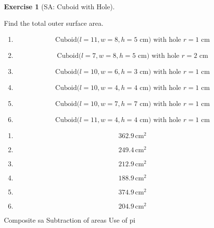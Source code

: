 \documentclass[
  letterpaper,
  DIV=11,
  numbers=noendperiod]{scrreprt}
\theoremstyle{definition}
\newtheorem{exercise}{Exercise}[chapter]
\theoremstyle{remark}
\begin{document}
\begin{exercise}[SA: Cuboid with
Hole]\protect\hypertarget{exr-sa-11}{}\label{exr-sa-11}

Find the total outer surface area.

\begin{enumerate}
\def\labelenumi{\alph{enumi})}
\item
  \[\text{Cuboid}(l=11,w=8,h=5\text{ cm) with hole }r=1\text{ cm}\]
\item
  \[\text{Cuboid}(l=7,w=8,h=5\text{ cm) with hole }r=2\text{ cm}\]
\item
  \[\text{Cuboid}(l=10,w=6,h=3\text{ cm) with hole }r=1\text{ cm}\]
\item
  \[\text{Cuboid}(l=10,w=4,h=4\text{ cm) with hole }r=1\text{ cm}\]
\item
  \[\text{Cuboid}(l=10,w=7,h=7\text{ cm) with hole }r=1\text{ cm}\]
\item
  \[\text{Cuboid}(l=11,w=4,h=4\text{ cm) with hole }r=1\text{ cm}\]
\end{enumerate}

\begin{tcolorbox}[enhanced jigsaw, opacitybacktitle=0.6, coltitle=black, arc=.35mm, colframe=quarto-callout-tip-color-frame, colback=white, bottomrule=.15mm, left=2mm, colbacktitle=quarto-callout-tip-color!10!white, titlerule=0mm, opacityback=0, title=\textcolor{quarto-callout-tip-color}{\faLightbulb}\hspace{0.5em}{🔍 View Solution}, leftrule=.75mm, breakable, rightrule=.15mm, bottomtitle=1mm, toptitle=1mm, toprule=.15mm]

\begin{enumerate}
\def\labelenumi{\alph{enumi})}
\item
  \[362.9\,\text{cm}^{2}\]
\item
  \[249.4\,\text{cm}^{2}\]
\item
  \[212.9\,\text{cm}^{2}\]
\item
  \[188.9\,\text{cm}^{2}\]
\item
  \[374.9\,\text{cm}^{2}\]
\item
  \[204.9\,\text{cm}^{2}\]
\end{enumerate}

\end{tcolorbox}

{Composite sa} {Subtraction of areas} {Use of pi}

\end{exercise}
\end{document}
